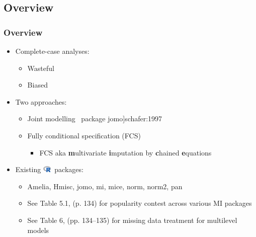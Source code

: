 \documentclass[UKenglish
  pdftex                    %
  dvipsnames                %
]{beamer}
\newcommand{\xmark}{\textcolor{red}{\ding{55}}}
\newcommand{\cR}{\includegraphics[width=1.1em]{Figures/R.png}\ }
\newcommand{\pk}[1]{\textcolor{Rblue}{\textsf{#1}}}
\begin{document}
\subsection{Overview}
\begin{frame}\frametitle{Overview}

\begin{itemize}

  \item Complete-case analyses:
  \begin{itemize}
    \item[\xmark] Wasteful
    \item[\xmark] Biased
  \end{itemize}

  \item Two approaches:
  \begin{itemize}
    \item[\ding{192}] Joint modelling \parencite[JM,][, \cR package \pk{jomo}]{schafer:1997}
    \item[\ding{193}] Fully conditional specification (FCS)
    \begin{itemize}
      \item[\ding{43}] \textcolor{uiogrey5}{FCS aka \textbf{m}ultivariate \textbf{i}mputation by \textbf{c}hained \textbf{e}quations \parencite[MICE,][]{vanbuuren:2011}}
    \end{itemize}
  \end{itemize}

  \item Existing \cR packages:
  \begin{itemize}
    \item[\ding{228}] \pk{Amelia}, \pk{Hmisc}, \pk{jomo}, \pk{mi}, \pk{mice}, \pk{norm}, \pk{norm2}, \pk{pan}
    \item[\ding{45}] \textcolor{uiogrey5}{See Table 5.1, \textcite{kleinke:2020} (p. 134) for popularity contest across various MI packages}
    \item[\ding{45}] \textcolor{uiogrey5}{See Table 6, \textcite{grund:2018} (pp. 134--135) for missing data treatment for multilevel models}
  \end{itemize}

\end{itemize}

\end{frame}
\end{document}
